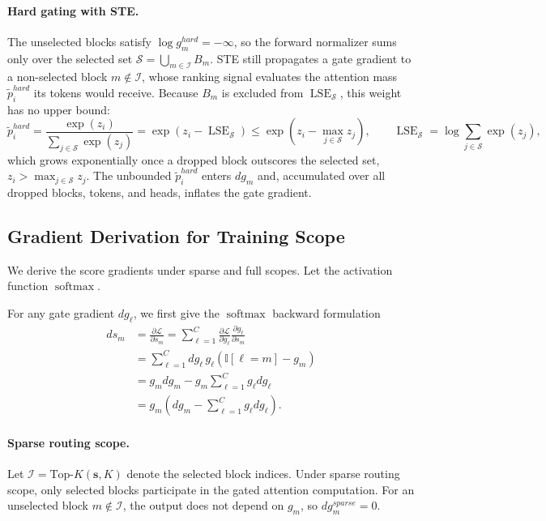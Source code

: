 \paragraph{Hard gating with STE.}
The unselected blocks satisfy $\log g^{hard}_m=-\infty$, so the forward normalizer sums only over the selected set $\mathcal{S}=\bigcup_{m\in\mathcal{I}}B_m$.
STE still propagates a gate gradient to a non-selected block $m\notin\mathcal{I}$, whose ranking signal evaluates the attention mass $\tilde p_i^{hard}$ its tokens would receive.
Because $B_m$ is excluded from $\operatorname{LSE}_{\mathcal{S}}$, this weight has no upper bound:
\[
    \tilde p_i^{hard}
    =
    \frac{\exp(z_i)}
    {\sum_{j\in\mathcal{S}}\exp(z_j)}
    =
    \exp\!\left(z_i-\operatorname{LSE}_{\mathcal{S}}\right)
    \le
    \exp\!\left(z_i-\max_{j\in\mathcal{S}}z_j\right),
    \qquad
    \operatorname{LSE}_{\mathcal{S}}
    =
    \log\sum_{j\in\mathcal{S}}\exp(z_j),
\]
which grows exponentially once a dropped block outscores the selected set, $z_i>\max_{j\in\mathcal{S}}z_j$.
The unbounded $\tilde p_i^{hard}$ enters $dg_m$ and, accumulated over all dropped blocks, tokens, and heads, inflates the gate gradient.


\subsection{Gradient Derivation for Training Scope}
\label{app:deriv_routing_scope}
We derive the score gradients under sparse and full scopes.
Let the activation function $\operatorname{softmax}$.

For any gate gradient $dg_\ell$, we first give the $\operatorname{softmax}$ backward formulation
\[
\begin{aligned}
    ds_m
    &=
    \frac{\partial \mathcal{L}}{\partial s_m}
    =
    \sum_{\ell=1}^{C}
    \frac{\partial \mathcal{L}}{\partial g_\ell}
    \frac{\partial g_\ell}{\partial s_m}
    \\
    &=
    \sum_{\ell=1}^{C}
    dg_\ell\,
    g_\ell
    \left(
        \mathbb{I}[\ell=m]-g_m
    \right)
    \\
    &=
    g_m dg_m
    -
    g_m
    \sum_{\ell=1}^{C} g_\ell dg_\ell
    \\
    &=
    g_m
    \left(
        dg_m
        -
        \sum_{\ell=1}^{C} g_\ell dg_\ell
    \right).
\end{aligned}
\]

\paragraph{Sparse routing scope.}
Let $\mathcal{I}=\text{Top-}K(\mathbf{s},K)$ denote the selected block indices.
Under sparse routing scope, only selected blocks participate in the gated attention computation.
For an unselected block $m\notin\mathcal{I}$, the output does not depend on $g_m$, so $dg_m^{sparse}=0$.

